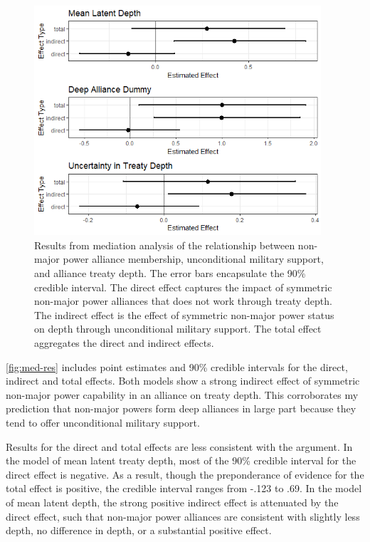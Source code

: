 \documentclass[12pt]{article}
\begin{document}
\begin{figure}[hbtp]
\centering
\includegraphics[width=0.95\textwidth]{../figures/med-res.png}
\caption{Results from mediation analysis of the relationship between non-major power alliance membership, unconditional military support, and alliance treaty depth. The error bars encapsulate the 90\% credible interval. The direct effect captures the impact of symmetric non-major power alliances that does not work through treaty depth. The indirect effect is the effect of symmetric non-major power status on depth through unconditional military support. The total effect aggregates the direct and indirect effects.}
\label{fig:med-res}
\end{figure}


\autoref{fig:med-res} includes point estimates and 90\% credible intervals for the direct, indirect and total effects. 
Both models show a strong indirect effect of symmetric non-major power capability in an alliance on treaty depth. 
This corroborates my prediction that non-major powers form deep alliances in large part because they tend to offer unconditional military support. 

Results for the direct and total effects are less consistent with the argument. 
In the model of mean latent treaty depth, most of the 90\% credible interval for the direct effect is negative. 
As a result, though the preponderance of evidence for the total effect is positive, the credible interval ranges from -.123 to .69.
In the model of mean latent depth, the strong positive indirect effect is attenuated by the direct effect, such that non-major power alliances are consistent with slightly less depth, no difference in depth, or a substantial positive effect. 
\end{document}
